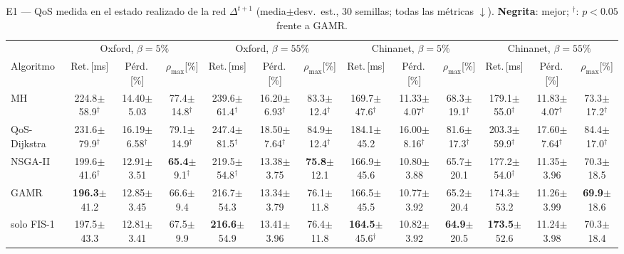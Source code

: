 \begin{table}[!t]
\centering
\caption{E1 --- QoS medida en el estado realizado de la red $\Delta^{t+1}$ (media$\pm$desv.\ est., 30 semillas; todas las m\'etricas $\downarrow$). \textbf{Negrita}: mejor; $^\dagger$: $p<0.05$ frente a GAMR.}
\label{tab:e1qos}
\scriptsize
\setlength{\tabcolsep}{2.2pt}
\begin{tabular}{l|ccc|ccc|ccc|ccc}
\toprule
 & \multicolumn{3}{c|}{Oxford, $\beta{=}5\%$} & \multicolumn{3}{c|}{Oxford, $\beta{=}55\%$} & \multicolumn{3}{c|}{Chinanet, $\beta{=}5\%$} & \multicolumn{3}{c}{Chinanet, $\beta{=}55\%$} \\
Algoritmo & Ret.\,[ms] & P\'erd.\,[\%] & $\rho_{\max}$[\%] & Ret.\,[ms] & P\'erd.\,[\%] & $\rho_{\max}$[\%] & Ret.\,[ms] & P\'erd.\,[\%] & $\rho_{\max}$[\%] & Ret.\,[ms] & P\'erd.\,[\%] & $\rho_{\max}$[\%] \\
\midrule
MH & 224.8{\tiny$\pm$58.9}$^\dagger$ & 14.40{\tiny$\pm$5.03} & 77.4{\tiny$\pm$14.8}$^\dagger$ & 239.6{\tiny$\pm$61.4}$^\dagger$ & 16.20{\tiny$\pm$6.93}$^\dagger$ & 83.3{\tiny$\pm$12.4}$^\dagger$ & 169.7{\tiny$\pm$47.6}$^\dagger$ & 11.33{\tiny$\pm$4.07}$^\dagger$ & 68.3{\tiny$\pm$19.1}$^\dagger$ & 179.1{\tiny$\pm$55.0}$^\dagger$ & 11.83{\tiny$\pm$4.07}$^\dagger$ & 73.3{\tiny$\pm$17.2}$^\dagger$ \\
QoS-Dijkstra & 231.6{\tiny$\pm$79.9}$^\dagger$ & 16.19{\tiny$\pm$6.58}$^\dagger$ & 79.1{\tiny$\pm$14.9}$^\dagger$ & 247.4{\tiny$\pm$81.5}$^\dagger$ & 18.50{\tiny$\pm$7.64}$^\dagger$ & 84.9{\tiny$\pm$12.4}$^\dagger$ & 184.1{\tiny$\pm$45.2} & 16.00{\tiny$\pm$8.16}$^\dagger$ & 81.6{\tiny$\pm$17.3}$^\dagger$ & 203.3{\tiny$\pm$59.9}$^\dagger$ & 17.60{\tiny$\pm$7.64}$^\dagger$ & 84.4{\tiny$\pm$17.0}$^\dagger$ \\
\midrule
NSGA-II & 199.6{\tiny$\pm$41.6}$^\dagger$ & 12.91{\tiny$\pm$3.51} & \textbf{65.4}{\tiny$\pm$9.1}$^\dagger$ & 219.5{\tiny$\pm$54.8}$^\dagger$ & 13.38{\tiny$\pm$3.75} & \textbf{75.8}{\tiny$\pm$12.1} & 166.9{\tiny$\pm$45.6} & 10.80{\tiny$\pm$3.88} & 65.7{\tiny$\pm$20.1} & 177.2{\tiny$\pm$54.0}$^\dagger$ & 11.35{\tiny$\pm$3.96} & 70.3{\tiny$\pm$18.5} \\
GAMR & \textbf{196.3}{\tiny$\pm$41.2} & 12.85{\tiny$\pm$3.45} & 66.6{\tiny$\pm$9.4} & 216.7{\tiny$\pm$54.3} & 13.34{\tiny$\pm$3.79} & 76.1{\tiny$\pm$11.8} & 166.5{\tiny$\pm$45.5} & 10.77{\tiny$\pm$3.92} & 65.2{\tiny$\pm$20.4} & 174.3{\tiny$\pm$53.2} & 11.26{\tiny$\pm$3.99} & \textbf{69.9}{\tiny$\pm$18.6} \\
\midrule
solo FIS-1 & 197.5{\tiny$\pm$43.3} & 12.81{\tiny$\pm$3.41} & 67.5{\tiny$\pm$9.9} & \textbf{216.6}{\tiny$\pm$54.9} & 13.41{\tiny$\pm$3.96} & 76.4{\tiny$\pm$11.8} & \textbf{164.5}{\tiny$\pm$45.6}$^\dagger$ & 10.82{\tiny$\pm$3.92} & \textbf{64.9}{\tiny$\pm$20.5} & \textbf{173.5}{\tiny$\pm$52.6} & 11.24{\tiny$\pm$3.98} & 70.3{\tiny$\pm$18.4} \\

\end{tabular}
\end{table}
